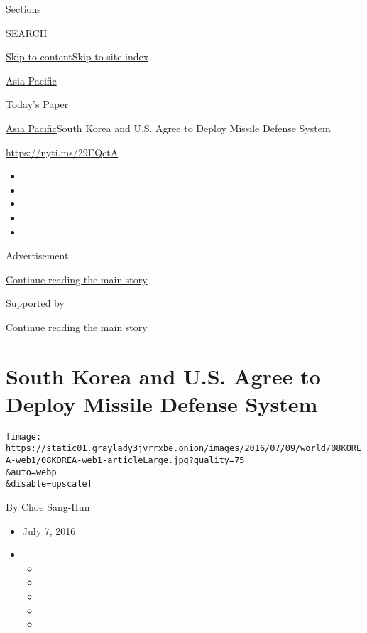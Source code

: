 Sections

SEARCH

\protect\hyperlink{site-content}{Skip to
content}\protect\hyperlink{site-index}{Skip to site index}

\href{https://www.nytimes3xbfgragh.onion/section/world/asia}{Asia
Pacific}

\href{https://myaccount.nytimes3xbfgragh.onion/auth/login?response_type=cookie\&client_id=vi}{}

\href{https://www.nytimes3xbfgragh.onion/section/todayspaper}{Today's
Paper}

\href{/section/world/asia}{Asia Pacific}\textbar{}South Korea and U.S.
Agree to Deploy Missile Defense System

\url{https://nyti.ms/29EQctA}

\begin{itemize}
\item
\item
\item
\item
\item
\end{itemize}

Advertisement

\protect\hyperlink{after-top}{Continue reading the main story}

Supported by

\protect\hyperlink{after-sponsor}{Continue reading the main story}

\hypertarget{south-korea-and-us-agree-to-deploy-missile-defense-system}{%
\section{South Korea and U.S. Agree to Deploy Missile Defense
System}\label{south-korea-and-us-agree-to-deploy-missile-defense-system}}

\texttt{[image: https://static01.graylady3jvrrxbe.onion/images/2016/07/09/world/08KOREA-web1/08KOREA-web1-articleLarge.jpg?quality=75\\\&auto=webp\\\&disable=upscale]}

By \href{http://www.nytimes3xbfgragh.onion/by/choe-sang-hun}{Choe
Sang-Hun}

\begin{itemize}
\item
  July 7, 2016
\item
  \begin{itemize}
  \item
  \item
  \item
  \item
  \item
  \end{itemize}
\end{itemize}

